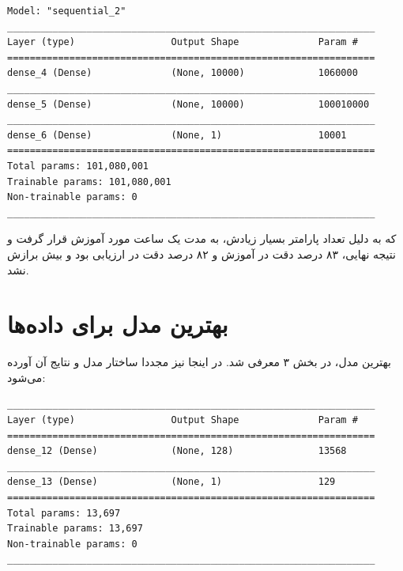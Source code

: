 \documentclass{article}
\begin{document}
\begin{latin}
\begin{lstlisting}
Model: "sequential_2"
_________________________________________________________________
Layer (type)                 Output Shape              Param #   
=================================================================
dense_4 (Dense)              (None, 10000)             1060000   
_________________________________________________________________
dense_5 (Dense)              (None, 10000)             100010000 
_________________________________________________________________
dense_6 (Dense)              (None, 1)                 10001     
=================================================================
Total params: 101,080,001
Trainable params: 101,080,001
Non-trainable params: 0
_________________________________________________________________
\end{lstlisting}
\end{latin}

که به دلیل تعداد پارامتر بسیار زیادش، به مدت یک ساعت مورد آموزش قرار گرفت و نتیجه نهایی، ۸۳ درصد دقت در آموزش و ۸۲ درصد دقت در ارزیابی بود و بیش برازش نشد.



\section{
بهترین مدل برای داده‌ها
}

بهترین مدل، در بخش ۳ معرفی شد. در اینجا نیز مجددا ساختار مدل و نتایج آن آورده می‌شود:

\begin{latin}
\begin{lstlisting}
_________________________________________________________________
Layer (type)                 Output Shape              Param #   
=================================================================
dense_12 (Dense)             (None, 128)               13568     
_________________________________________________________________
dense_13 (Dense)             (None, 1)                 129       
=================================================================
Total params: 13,697
Trainable params: 13,697
Non-trainable params: 0
_________________________________________________________________
\end{lstlisting}
\end{latin}
\end{document}
